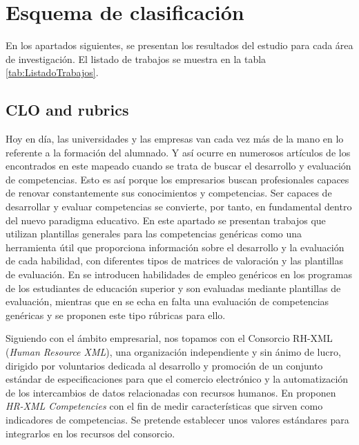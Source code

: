 \section{Esquema de clasificación}

En los apartados siguientes, se presentan los resultados del estudio para cada área de investigación. El listado de trabajos se muestra en la tabla \ref{tab:ListadoTrabajos}.

\subsection{CLO and rubrics}
Hoy en día, las universidades y las empresas van cada vez más de la mano en lo referente a la formación del alumnado. Y así ocurre en numerosos artículos de los encontrados en este mapeado cuando se trata de buscar el desarrollo y evaluación de competencias. Esto es así porque los empresarios buscan profesionales capaces de renovar constantemente sus conocimientos y competencias. Ser capaces de desarrollar y evaluar competencias se convierte, por tanto, en fundamental dentro del nuevo paradigma educativo. En este apartado se presentan trabajos que utilizan plantillas generales para las competencias genéricas como una herramienta útil que proporciona información sobre el desarrollo y la evaluación de cada habilidad, con diferentes tipos de matrices de valoración y las plantillas de evaluación. En \cite{Terron-Lopez:2013} se introducen habilidades de empleo genéricos en los programas de los estudiantes de educación superior y son evaluadas mediante plantillas de evaluación, mientras que en \cite{Feldt:2009} se echa en falta una evaluación de competencias genéricas y se proponen este tipo rúbricas para ello.

Siguiendo con el ámbito empresarial, nos topamos con el Consorcio RH-XML (\emph{Human Resource XML}), una organización independiente y sin ánimo de lucro, dirigido por voluntarios dedicada al desarrollo y promoción de un conjunto estándar de especificaciones para que el comercio electrónico y la automatización de los intercambios de datos relacionadas con recursos humanos. En \cite{Adelsberger:2008} proponen \emph{HR-XML Competencies} con el fin de medir características que sirven como indicadores de competencias. Se pretende establecer unos valores estándares para integrarlos en los recursos del consorcio.


